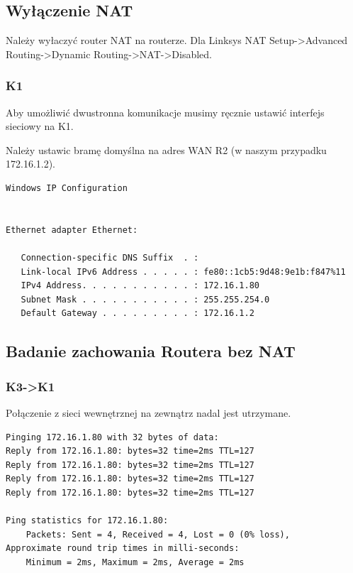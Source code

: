 \documentclass[11pt]{article}
\begin{document}
\subsection{Wyłączenie NAT}
\label{sec:org3659aa0}
Należy wyłaczyć router NAT na routerze.
Dla Linksys NAT Setup->Advanced Routing->Dynamic Routing->NAT->Disabled.
\subsubsection{K1}
\label{sec:org89c410d}
Aby umożliwić dwustronna komunikacje musimy ręcznie ustawić interfejs sieciowy na K1.

Należy ustawic bramę domyślna na adres WAN R2 (w naszym przypadku 172.16.1.2).
\begin{verbatim}
Windows IP Configuration


Ethernet adapter Ethernet:

   Connection-specific DNS Suffix  . : 
   Link-local IPv6 Address . . . . . : fe80::1cb5:9d48:9e1b:f847%11
   IPv4 Address. . . . . . . . . . . : 172.16.1.80
   Subnet Mask . . . . . . . . . . . : 255.255.254.0
   Default Gateway . . . . . . . . . : 172.16.1.2
\end{verbatim}
\subsection{Badanie zachowania Routera bez NAT}
\label{sec:org22453dd}
\subsubsection{K3->K1}
\label{sec:orgc965f0d}
Połączenie z sieci wewnętrznej na zewnątrz nadal jest utrzymane.
\begin{verbatim}
Pinging 172.16.1.80 with 32 bytes of data:
Reply from 172.16.1.80: bytes=32 time=2ms TTL=127
Reply from 172.16.1.80: bytes=32 time=2ms TTL=127
Reply from 172.16.1.80: bytes=32 time=2ms TTL=127
Reply from 172.16.1.80: bytes=32 time=2ms TTL=127

Ping statistics for 172.16.1.80:
    Packets: Sent = 4, Received = 4, Lost = 0 (0% loss),
Approximate round trip times in milli-seconds:
    Minimum = 2ms, Maximum = 2ms, Average = 2ms
\end{verbatim}
\end{document}
